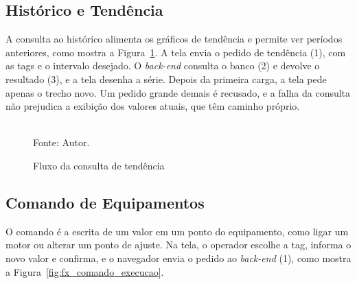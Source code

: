 \subsection{Histórico e Tendência}

\par A consulta ao histórico alimenta os gráficos de tendência e permite ver períodos anteriores, como mostra a Figura~\ref{fig:fx_tendencia}. A tela envia o pedido de tendência (1), com as tags e o intervalo desejado. O \emph{back-end} consulta o banco (2) e devolve o resultado (3), e a tela desenha a série. Depois da primeira carga, a tela pede apenas o trecho novo. Um pedido grande demais é recusado, e a falha da consulta não prejudica a exibição dos valores atuais, que têm caminho próprio.

\begin{figure}[H]
    \centering
    \caption{Fluxo da consulta de tendência}
    \label{fig:fx_tendencia}
    \vspace{0.4cm}
    \vspace{0.2cm} \\
    Fonte: Autor.
\end{figure}

\subsection{Comando de Equipamentos}

\par O comando é a escrita de um valor em um ponto do equipamento, como ligar um motor ou alterar um ponto de ajuste. Na tela, o operador escolhe a tag, informa o novo valor e confirma, e o navegador envia o pedido ao \emph{back-end} (1), como mostra a Figura~\ref{fig:fx_comando_execucao}.

